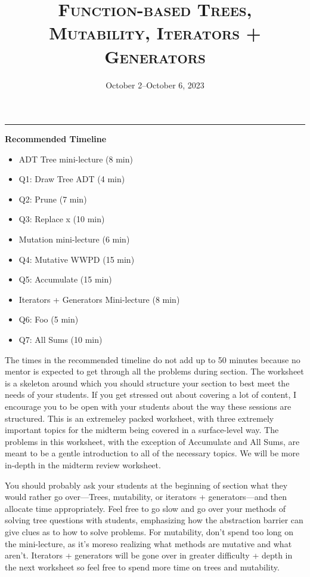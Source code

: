 \documentclass{exam}
\title{\textsc{Function-based Trees, Mutability, Iterators + Generators}}
\date{October 2--October 6, 2023}
\begin{document}
\maketitle
\rule{\textwidth}{0.15em}


\begin{meta}
\textbf{Recommended Timeline}
\begin{itemize}
    \item ADT Tree mini-lecture (8 min)
    \item Q1: Draw Tree ADT (4 min)
    \item Q2: Prune (7 min)
    \item Q3: Replace x (10 min)
    \item Mutation mini-lecture (6 min)
    \item Q4: Mutative WWPD (15 min)
    \item Q5: Accumulate (15 min)
    \item Iterators + Generators Mini-lecture (8 min)
    \item Q6: Foo (5 min)
    \item Q7: All Sums (10 min)

\end{itemize}
The times in the recommended timeline do not add up to 50 minutes because no mentor
is expected to get through all the problems during section. The worksheet is a skeleton
around which you should structure your section to best meet the needs of your students.
If you get stressed out about covering a lot of content, I encourage you to be open with
your students about the way these sessions are structured. This is an extremeley packed worksheet, with three extremely
important topics for the midterm being covered in a surface-level way. The problems in this worksheet, with the exception of Accumulate 
and All Sums, are meant to be a gentle introduction to all of the necessary topics. We will be more in-depth in the midterm review worksheet.

You should probably ask your students at the beginning of section what they would rather go
over---Trees, mutability, or iterators + generators---and then allocate time appropriately.
Feel free to go slow and go over your methods of solving tree questions with students, emphasizing how the abstraction barrier can give clues 
as to how to solve problems. For mutability, don't spend too long on the mini-lecture, as it's moreso realizing what methods are mutative and what aren't.
Iterators + generators will be gone over in greater difficulty + depth in the next worksheet so feel free to spend more time on trees and mutability.
\end{meta}
\end{document}
